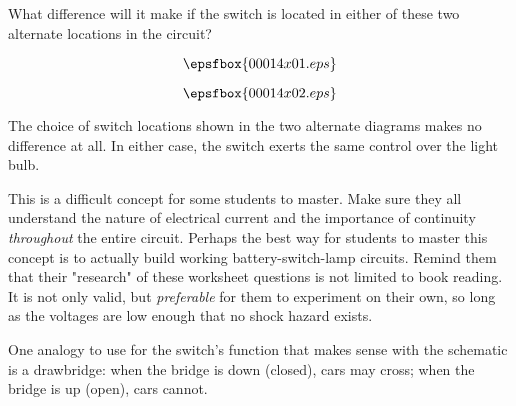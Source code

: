 

What difference will it make if the switch is located in either of these two alternate locations in the circuit?

$$\epsfbox{00014x01.eps}$$

$$\epsfbox{00014x02.eps}$$







The choice of switch locations shown in the two alternate diagrams makes no difference at all.  In either case, the switch exerts the same control over the light bulb.







This is a difficult concept for some students to master.  Make sure they all understand the nature of electrical current and the importance of continuity {\it throughout} the entire circuit.  Perhaps the best way for students to master this concept is to actually build working battery-switch-lamp circuits.  Remind them that their "research" of these worksheet questions is not limited to book reading.  It is not only valid, but {\it preferable} for them to experiment on their own, so long as the voltages are low enough that no shock hazard exists.

One analogy to use for the switch's function that makes sense with the schematic is a drawbridge: when the bridge is down (closed), cars may cross; when the bridge is up (open), cars cannot.




